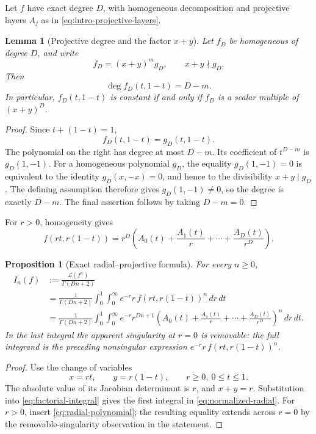 \documentclass[11pt]{article}
\numberwithin{equation}{section}
\newtheorem{proposition}[proposition]{Proposition}
\newtheorem{lemma}[lemma]{Lemma}
\theoremstyle{definition}
\theoremstyle{remark}
\newcommand{\Lfac}{\mathcal L}
\begin{document}
Let $f$ have exact degree $D$, with homogeneous decomposition and
projective layers $A_j$ as in \eqref{eq:intro-projective-layers}.

\begin{lemma}[Projective degree and the factor $x+y$]\label{lem:projective-degree}
Let $f_D$ be homogeneous of degree $D$, and write
\[
  f_D=(x+y)^m g_D,
  \qquad x+y\nmid g_D.
\]
Then
\[
  \deg f_D(t,1-t)=D-m.
\]
In particular, $f_D(t,1-t)$ is constant if and only if $f_D$ is a scalar multiple of $(x+y)^D$.
\end{lemma}

\begin{proof}
Since $t+(1-t)=1$,
\[
  f_D(t,1-t)=g_D(t,1-t).
\]
The polynomial on the right has degree at most $D-m$.  Its coefficient of
$t^{D-m}$ is $g_D(1,-1)$.  For a homogeneous polynomial $g_D$, the equality
$g_D(1,-1)=0$ is equivalent to the identity $g_D(x,-x)=0$, and hence to the
divisibility $x+y\mid g_D$.  The defining assumption therefore gives
$g_D(1,-1)\ne0$, so the degree is exactly $D-m$.  The final assertion follows
by taking $D-m=0$.
\end{proof}

For $r>0$, homogeneity gives
\begin{equation}\label{eq:radial-polynomial}
  f(rt,r(1-t))
  =r^D\left(A_0(t)+\frac{A_1(t)}r+\cdots+\frac{A_D(t)}{r^D}\right).
\end{equation}

\begin{proposition}[Exact radial--projective formula]\label{prop:radial-projective}
For every $n\ge0$,
\begin{equation}\label{eq:normalized-radial}
\begin{split}
  I_n(f)&:=\frac{\Lfac(f^n)}{\Gamma(Dn+2)}\\
  &=\frac1{\Gamma(Dn+2)}
    \int_0^1\!\int_0^\infty
    e^{-r}r\,f(rt,r(1-t))^n\,dr\,dt\\
  &=\frac1{\Gamma(Dn+2)}
    \int_0^1\!\int_0^\infty
    e^{-r}r^{Dn+1}
    \left(A_0(t)+\frac{A_1(t)}r+\cdots+\frac{A_D(t)}{r^D}\right)^n
    \,dr\,dt.
\end{split}
\end{equation}
In the last integral the apparent singularity at $r=0$ is removable: the
full integrand is the preceding nonsingular expression
$e^{-r}r\,f(rt,r(1-t))^n$.
\end{proposition}

\begin{proof}
Use the change of variables
\[
  x=rt,\qquad y=r(1-t),
  \qquad r\ge0,\ 0\le t\le1.
\]
The absolute value of its Jacobian determinant is $r$, and $x+y=r$.
Substitution into \eqref{eq:factorial-integral} gives the first integral in
\eqref{eq:normalized-radial}.  For $r>0$, insert
\eqref{eq:radial-polynomial}; the resulting equality extends across $r=0$
by the removable-singularity observation in the statement.
\end{proof}
\end{document}
